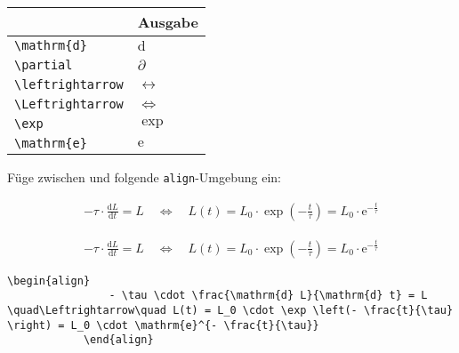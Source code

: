 \documentclass["WS\space 16-17\space -\space LaTeX-Kurs\space -\space Praesentation\space -\space 1.tex"]{subfiles}
\begin{document}
\begin{frame}[fragile]
	\begin{center}
		\begin{tabular}{ll}
			\toprule
			\color{math-cmd}{Mathe}\color{black}{-Befehl}							&	Ausgabe					\\ \midrule
			\lstinline|\mathrm{d}|		&	$\mathrm{d}$		\\
			\lstinline|\partial|		&	$\partial$		
			\\
			\lstinline|\leftrightarrow|		&	$\leftrightarrow$		
      \\
			\lstinline|\Leftrightarrow|		&	$\Leftrightarrow$		
			\\
			\lstinline|\exp|					&	$\exp$		\\
      \lstinline|\mathrm{e}|		& $\mathrm{e}$		\\
			\bottomrule
		\end{tabular}
	\end{center}
	\pause\btVFill
	\Aufgabee
		Füge zwischen \qquote{$\tau$} und  folgende \lstinline[basicstyle=\normalfont\normalsize]|align|-Umgebung ein:
		\begin{outputbox}
		    \begin{align}
		      - \tau \cdot \frac{\mathrm{d} L}{\mathrm{d} t} = L \quad\Leftrightarrow\quad L(t) = L_0 \cdot \exp \left(- \frac{t}{\tau} \right) = L_0 \cdot \mathrm{e}^{- \frac{t}{\tau}} \tag{4}
		    \end{align}	
	    \end{outputbox}
	\vspace{0.3cm}
\end{frame}
\begin{frame}[fragile]
	\Losung
		\begin{outputbox}
		    \begin{align}
		        - \tau \cdot \frac{\mathrm{d} L}{\mathrm{d} t} = L \quad\Leftrightarrow\quad L(t) = L_0 \cdot \exp \left(- \frac{t}{\tau} \right) = L_0 \cdot \mathrm{e}^{- \frac{t}{\tau}} \tag{4}
		    \end{align}
		\end{outputbox}

	\Code
		\begin{lstlisting}[gobble=12]
		    \begin{align}
		        - \tau \cdot \frac{\mathrm{d} L}{\mathrm{d} t} = L \quad\Leftrightarrow\quad L(t) = L_0 \cdot \exp \left(- \frac{t}{\tau} \right) = L_0 \cdot \mathrm{e}^{- \frac{t}{\tau}}
		    \end{align}
		\end{lstlisting}
\end{frame}
\end{document}
